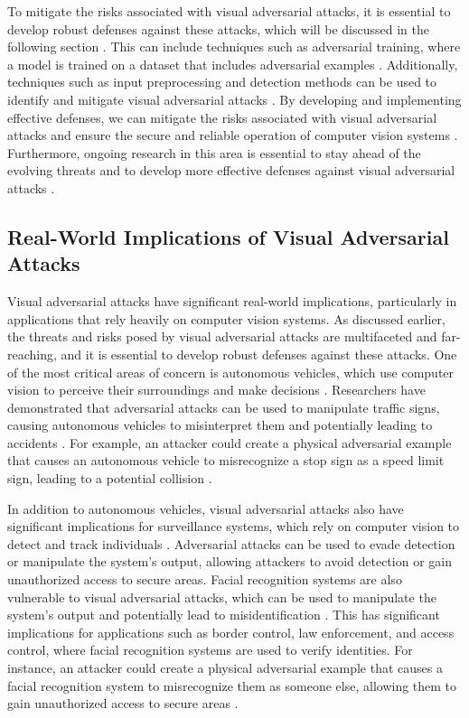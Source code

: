 \documentclass[11pt]{article}
\begin{document}
To mitigate the risks associated with visual adversarial attacks, it is essential to develop robust defenses against these attacks, which will be discussed in the following section \cite{ref16}. This can include techniques such as adversarial training, where a model is trained on a dataset that includes adversarial examples \cite{ref25}. Additionally, techniques such as input preprocessing and detection methods can be used to identify and mitigate visual adversarial attacks \cite{ref26}. By developing and implementing effective defenses, we can mitigate the risks associated with visual adversarial attacks and ensure the secure and reliable operation of computer vision systems \cite{ref16}. Furthermore, ongoing research in this area is essential to stay ahead of the evolving threats and to develop more effective defenses against visual adversarial attacks \cite{ref27}.

\subsection{Real-World Implications of Visual Adversarial Attacks}

Visual adversarial attacks have significant real-world implications, particularly in applications that rely heavily on computer vision systems. As discussed earlier, the threats and risks posed by visual adversarial attacks are multifaceted and far-reaching, and it is essential to develop robust defenses against these attacks. One of the most critical areas of concern is autonomous vehicles, which use computer vision to perceive their surroundings and make decisions \cite{ref28}. Researchers have demonstrated that adversarial attacks can be used to manipulate traffic signs, causing autonomous vehicles to misinterpret them and potentially leading to accidents \cite{ref29}. For example, an attacker could create a physical adversarial example that causes an autonomous vehicle to misrecognize a stop sign as a speed limit sign, leading to a potential collision \cite{ref30}.

In addition to autonomous vehicles, visual adversarial attacks also have significant implications for surveillance systems, which rely on computer vision to detect and track individuals \cite{ref11}. Adversarial attacks can be used to evade detection or manipulate the system's output, allowing attackers to avoid detection or gain unauthorized access to secure areas. Facial recognition systems are also vulnerable to visual adversarial attacks, which can be used to manipulate the system's output and potentially lead to misidentification \cite{ref31}. This has significant implications for applications such as border control, law enforcement, and access control, where facial recognition systems are used to verify identities. For instance, an attacker could create a physical adversarial example that causes a facial recognition system to misrecognize them as someone else, allowing them to gain unauthorized access to secure areas \cite{ref32}.
\end{document}
